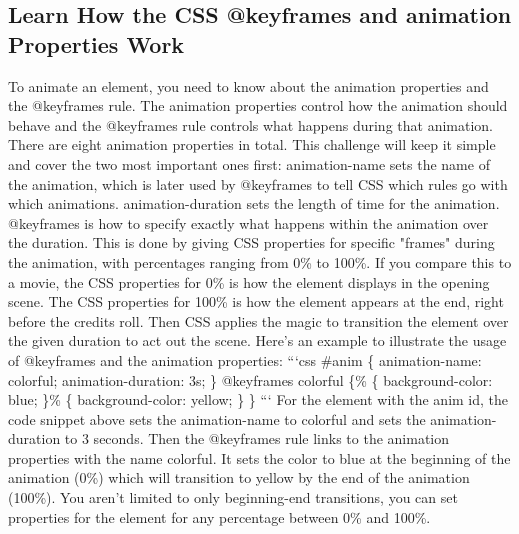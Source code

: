 \documentclass{article}%
\begin{document}
\subsection{Learn How the CSS @keyframes and animation Properties Work}%
\label{subsec:LearnHowtheCSS@keyframesandanimationPropertiesWork}%
To animate an element, you need to know about the animation properties and the @keyframes rule. The animation properties control how the animation should behave and the @keyframes rule controls what happens during that animation. There are eight animation properties in total. This challenge will keep it simple and cover the two most important ones first:\newline%
animation{-}name sets the name of the animation, which is later used by @keyframes to tell CSS which rules go with which animations.\newline%
animation{-}duration sets the length of time for the animation.\newline%
@keyframes is how to specify exactly what happens within the animation over the duration. This is done by giving CSS properties for specific "frames" during the animation, with percentages ranging from 0\% to 100\%. If you compare this to a movie, the CSS properties for 0\% is how the element displays in the opening scene. The CSS properties for 100\% is how the element appears at the end, right before the credits roll. Then CSS applies the magic to transition the element over the given duration to act out the scene. Here's an example to illustrate the usage of @keyframes and the animation properties:\newline%
```css\newline%
\#anim \{\newline%
  animation{-}name: colorful;\newline%
  animation{-}duration: 3s;\newline%
\}\newline%
@keyframes colorful \{\% \{\newline%
    background{-}color: blue;\newline%
  \}\% \{\newline%
    background{-}color: yellow;\newline%
  \}\newline%
\}\newline%
```\newline%
For the element with the anim id, the code snippet above sets the animation{-}name to colorful and sets the animation{-}duration to 3 seconds. Then the @keyframes rule links to the animation properties with the name colorful. It sets the color to blue at the beginning of the animation (0\%) which will transition to yellow by the end of the animation (100\%). You aren't limited to only beginning{-}end transitions, you can set properties for the element for any percentage between 0\% and 100\%.\newline%
\end{document}
